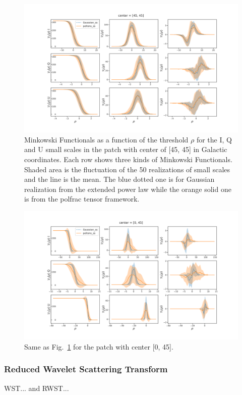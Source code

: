 \documentclass[twocolumn]{aastex631}
\begin{document}
\begin{figure}[hbt]
    \centering
    \includegraphics[width=180mm]{center_45_45.pdf}
    \caption{Minkowski Functionals as a function of the threshold $\rho$ for the I, Q and U small scales in the patch with center of [45, 45] in Galactic coordinates. Each row shows three kinds of Minkowski Functionals. Shaded area is the fluctuation of the 50 realizations of small scales and the line is the mean. The blue dotted one is for Gaussian realization from the extended power law while the orange solid one is from the polfrac tensor framework. }
    \label{fig:MF:patch2}
\end{figure}

\begin{figure}[hbt]
    \centering
    \includegraphics[width=180mm]{center_0_45.pdf}
    \caption{Same as Fig.~\ref{fig:MF:patch2} for the patch with center [0, 45].}
    \label{fig:MF:patch1}
\end{figure}

\subsubsection{Reduced Wavelet Scattering Transform}
WST... and RWST...
\end{document}

